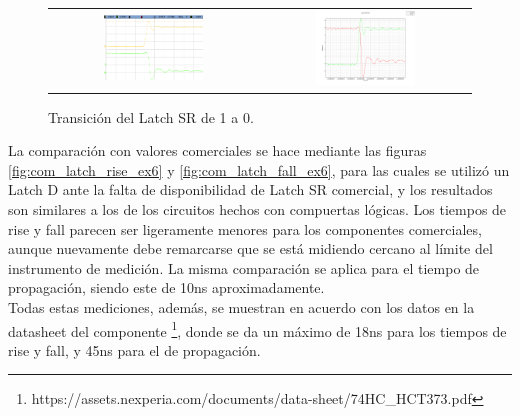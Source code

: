 \begin{figure}[H]
    \centering
    \begin{tabular}{c c}
        \includegraphics[width=0.5\textwidth]{../EJ6/Recursos/latch_sr_fall_osc} &
        \includegraphics[width=0.5\textwidth]{../EJ6/Recursos/latch_sr_fall}
    \end{tabular}
    \caption{Transición del Latch SR de 1 a 0.}
    \label{fig:latch_sr_fall_ex6}
\end{figure}

La comparación con valores comerciales se hace mediante las figuras \ref{fig:com_latch_rise_ex6} y \ref{fig:com_latch_fall_ex6}, para las cuales se utilizó un Latch D 
ante la falta de disponibilidad de Latch SR comercial, y los resultados son similares a los de los circuitos hechos con compuertas lógicas.
Los tiempos de rise y fall parecen ser ligeramente menores para los componentes comerciales, aunque nuevamente debe remarcarse que se está midiendo cercano al límite del 
instrumento de medición.
La misma comparación se aplica para el tiempo de propagación, siendo este de 10ns aproximadamente.\\
Todas estas mediciones, además, se muestran en acuerdo con los datos en la datasheet del componente \footnote{https://assets.nexperia.com/documents/data-sheet/74HC\_HCT373.pdf}, 
donde se da un máximo de 18ns para los tiempos de rise y fall, y 45ns para el de propagación.

